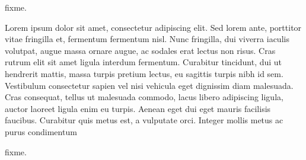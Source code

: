 

	fixme.

	Lorem ipsum dolor sit amet, consectetur adipiscing elit. Sed lorem ante, porttitor vitae fringilla et, fermentum fermentum nisl. Nunc fringilla, dui viverra iaculis volutpat, augue massa ornare augue, ac sodales erat lectus non risus. Cras rutrum elit sit amet ligula interdum fermentum. Curabitur tincidunt, dui ut hendrerit mattis, massa turpis pretium lectus, eu sagittis turpis nibh id sem. Vestibulum consectetur sapien vel nisi vehicula eget dignissim diam malesuada. Cras consequat, tellus ut malesuada commodo, lacus libero adipiscing ligula, auctor laoreet ligula enim eu turpis. Aenean eget dui eget mauris facilisis faucibus. Curabitur quis metus est, a vulputate orci. Integer mollis metus ac purus condimentum

	fixme.